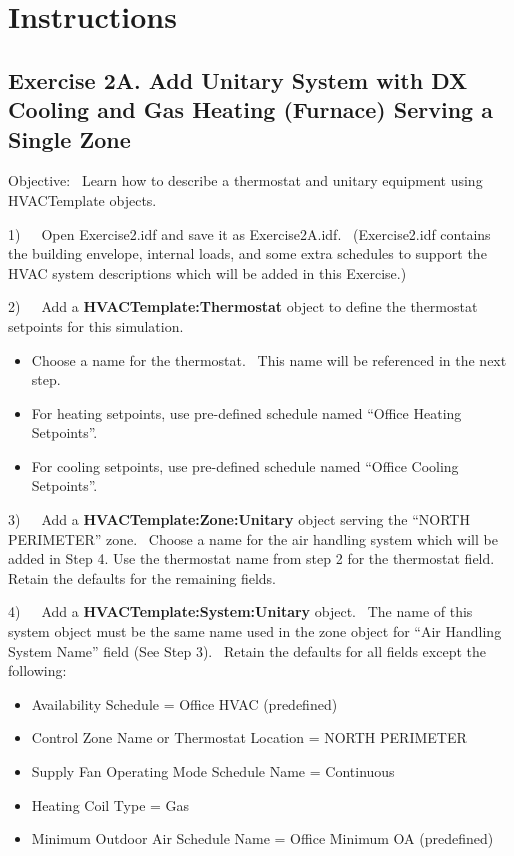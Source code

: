 \section{Instructions}\label{instructions}

\subsection{Exercise 2A. Add Unitary System with DX Cooling and Gas Heating (Furnace) Serving a Single Zone}\label{exercise-2a.-add-unitary-system-with-dx-cooling-and-gas-heating-furnace-serving-a-single-zone}

Objective:~ Learn how to describe a thermostat and unitary equipment using HVACTemplate objects.

1)~~~Open Exercise2.idf and save it as Exercise2A.idf.~ (Exercise2.idf contains the building envelope, internal loads, and some extra schedules to support the HVAC system descriptions which will be added in this Exercise.)

2)~~~Add a \textbf{HVACTemplate:Thermostat} object to define the thermostat setpoints for this simulation.

\begin{itemize}
\item
  Choose a name for the thermostat.~ This name will be referenced in the next step.
\item
  For heating setpoints, use pre-defined schedule named ``Office Heating Setpoints''.
\item
  For cooling setpoints, use pre-defined schedule named ``Office Cooling Setpoints''.
\end{itemize}

3)~~~Add a \textbf{HVACTemplate:Zone:Unitary} object serving the ``NORTH PERIMETER'' zone.~ Choose a name for the air handling system which will be added in Step 4. Use the thermostat name from step 2 for the thermostat field. Retain the defaults for the remaining fields.

4)~~~Add a \textbf{HVACTemplate:System:Unitary} object.~ The name of this system object must be the same name used in the zone object for ``Air Handling System Name'' field (See Step 3).~ Retain the defaults for all fields except the following:

\begin{itemize}
\item
  Availability Schedule = Office HVAC (predefined)
\item
  Control Zone Name or Thermostat Location = NORTH PERIMETER
\item
  Supply Fan Operating Mode Schedule Name = Continuous
\item
  Heating Coil Type = Gas
\item
  Minimum Outdoor Air Schedule Name = Office Minimum OA (predefined)
\end{itemize}

